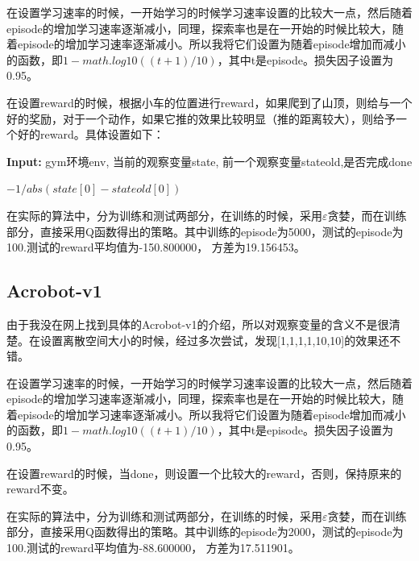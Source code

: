 \documentclass[a4paper,UTF8]{article}
\theoremstyle{definition}
\begin{document}
在设置学习速率的时候，一开始学习的时候学习速率设置的比较大一点，然后随着episode的增加学习速率逐渐减小，同理，探索率也是在一开始的时候比较大，随着episode的增加学习速率逐渐减小。所以我将它们设置为随着episode增加而减小的函数，即$1-math.log10((t+1)/10)$，其中t是episode。损失因子设置为0.95。

在设置reward的时候，根据小车的位置进行reward，如果爬到了山顶，则给与一个好的奖励，对于一个动作，如果它推的效果比较明显（推的距离较大），则给予一个好的reward。具体设置如下：

\begin{algorithm}

\hspace*{0.02in} {\bf Input:}
gym环境env, 当前的观察变量state, 前一个观察变量stateold,是否完成done


\begin{algorithmic}[1]

\State {}
\Else
\State \Return $-1/abs(state[0]-stateold[0])$
\EndIf

\State

\end{algorithmic}
\end{algorithm}

在实际的算法中，分为训练和测试两部分，在训练的时候，采用$\varepsilon$贪婪，而在训练部分，直接采用Q函数得出的策略。其中训练的episode为5000，测试的episode为100.测试的reward平均值为-150.800000， 方差为19.156453。


\subsection*{Acrobot-v1}

由于我没在网上找到具体的Acrobot-v1的介绍，所以对观察变量的含义不是很清楚。在设置离散空间大小的时候，经过多次尝试，发现[1,1,1,1,10,10]的效果还不错。

在设置学习速率的时候，一开始学习的时候学习速率设置的比较大一点，然后随着episode的增加学习速率逐渐减小，同理，探索率也是在一开始的时候比较大，随着episode的增加学习速率逐渐减小。所以我将它们设置为随着episode增加而减小的函数，即$1-math.log10((t+1)/10)$，其中t是episode。损失因子设置为0.95。

在设置reward的时候，当done，则设置一个比较大的reward，否则，保持原来的reward不变。

在实际的算法中，分为训练和测试两部分，在训练的时候，采用$\varepsilon$贪婪，而在训练部分，直接采用Q函数得出的策略。其中训练的episode为2000，测试的episode为100.测试的reward平均值为-88.600000， 方差为17.511901。
\end{document}
